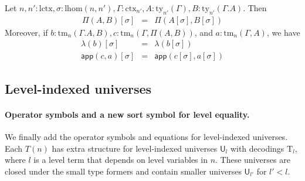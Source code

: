 \documentclass[11pt,a4paper]{article}
\theoremstyle{definition}
\newcommand{\UU}{\mathsf{U}}
\newcommand{\app}[2]{{#1\,#2}} %
\def\lhom{\mathrm{lhom}}
\def\UU{\mathsf{U}}
\def\lctx{\mathrm{lctx}}
\newcommand{\ctx}{\mathrm{ctx}}
\newcommand{\ty}{\mathrm{ty}}
\newcommand{\tm}{\mathrm{tm}}
\def\app{\mathsf{app}}
\newcommand{\Ta}{\mathrm{T}}
\begin{document}
Let $n, n' : \lctx , \sigma : \lhom(n,n'), \Gamma : \ctx_{n'}, A:\ty_{n'}(\Gamma), B:\ty_{n'}(\Gamma.A)$. Then
\begin{eqnarray*}
\Pi(A,B)[\sigma] &=& \Pi(A[\sigma],B[\sigma])
\end{eqnarray*}
Moreover, if $b : \tm_n(\Gamma.A,B), c :  \tm_n(\Gamma,\Pi(A,B))$,  and $a : \tm_n(\Gamma,A)$, we have
\begin{eqnarray*}
\lambda(b)[\sigma] &=&\lambda(b[\sigma])\\
\app(c,a)[\sigma] &=&\app(c[\sigma],a[\sigma])
\end{eqnarray*}

\subsection{Level-indexed universes} 
\paragraph{Operator symbols and a new sort symbol for level equality.} 
We finally add the operator symbols and equations for level-indexed universes.
Each $T(n)$ has extra structure for level-indexed universes $\UU_l$ with decodings $\Ta_l$, where $l$ is a level term that depends on level variables in $n$. These universes are closed under the small type formers and contain smaller universes $\UU_{l'}$ for $l' < l$.
\end{document}
